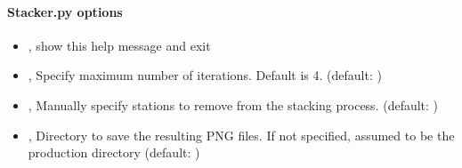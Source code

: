 \documentclass[letterpaper,10pt,english]{sphinxmanual}
\begin{document}
\paragraph{Stacker.py options}
\label{\detokenize{stacker:Stacker.py-options}}\begin{itemize}
\item {} 
\sphinxAtStartPar
{\hyperref[\detokenize{stacker:Stacker.py--h}]{}}, {\hyperref[\detokenize{stacker:Stacker.py---help}]{}} \sphinxhyphen{} show this help message and exit

\item {} 
\sphinxAtStartPar
{\hyperref[\detokenize{stacker:Stacker.py--max}]{}} , {\hyperref[\detokenize{stacker:Stacker.py---max_iters}]{}}  \sphinxhyphen{} Specify maximum number of iterations. Default is 4. (default: )

\item {} 
\sphinxAtStartPar
{\hyperref[\detokenize{stacker:Stacker.py--exclude}]{}} , {\hyperref[\detokenize{stacker:Stacker.py---exclude_stations}]{}}  \sphinxhyphen{} Manually specify stations to remove from the stacking process. (default: )

\item {} 
\sphinxAtStartPar
{\hyperref[\detokenize{stacker:Stacker.py--dir}]{}} , {\hyperref[\detokenize{stacker:Stacker.py---directory}]{}}  \sphinxhyphen{} Directory to save the resulting PNG files. If not specified, assumed to be the production directory (default: )


\end{itemize}
\end{document}
